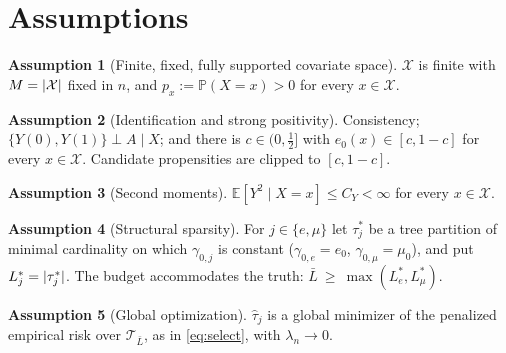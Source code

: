 \documentclass[11pt]{article}
\theoremstyle{plain}
\theoremstyle{definition}
\newtheorem{assumption}{Assumption}
\theoremstyle{remark}
\newcommand{\E}{\mathbb{E}}
\newcommand{\PP}{\mathbb{P}}
\newcommand{\cX}{\mathcal{X}}
\newcommand{\cT}{\mathcal{T}}
\newcommand{\ez}{e_0}
\newcommand{\mz}{\mu_0}
\newcommand{\that}{\widehat{\tau}}
\DeclarePairedDelimiter{\card}{\lvert}{\rvert}
\begin{document}
\section{Assumptions}\label{sec:assumptions}

\begin{assumption}[Finite, fixed, fully supported covariate space]\label{ass:finite}
$\cX$ is finite with $M=\card{\cX}$ fixed in $n$, and $p_x:=\PP(X=x)>0$ for every
$x\in\cX$.
\end{assumption}

\begin{assumption}[Identification and strong positivity]\label{ass:causal}
Consistency; $\{Y(0),Y(1)\}\perp A\mid X$; and there is $c\in(0,\tfrac12]$ with
$\ez(x)\in[c,1-c]$ for every $x\in\cX$. Candidate propensities are clipped to
$[c,1-c]$.
\end{assumption}

\begin{assumption}[Second moments]\label{ass:moments}
$\E[Y^2\mid X=x]\le C_Y<\infty$ for every $x\in\cX$.
\end{assumption}

\begin{assumption}[Structural sparsity]\label{ass:sparsity}
For $j\in\{e,\mu\}$ let $\tau^*_j$ be a tree partition of minimal cardinality on
which $\gamma_{0,j}$ is constant ($\gamma_{0,e}=\ez$, $\gamma_{0,\mu}=\mz$), and
put $L^*_j=\card{\tau^*_j}$. The budget accommodates the truth:
$\bar L\ \ge\ \max(L^*_e,L^*_\mu)$.
\end{assumption}

\begin{assumption}[Global optimization]\label{ass:global}
$\that_j$ is a global minimizer of the penalized empirical risk over
$\cT_{\bar L}$, as in \eqref{eq:select}, with $\lambda_n\to 0$.
\end{assumption}
\end{document}
